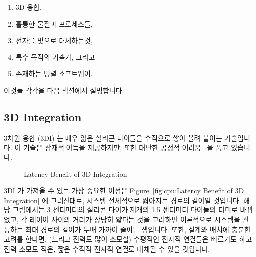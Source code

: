 \begin{enumerate}
\item	3D 융합,
\item	훌륭한 물질과 프로세스들,
\item	전자를 빛으로 대체하는것,
\item	특수 목적의 가속기, 그리고
\item	존재하는 병렬 소프트웨어.
\end{enumerate}

이것들 각각을 다음 섹션에서 설명합니다.

\iffalse
There are nevertheless some technologies (both hardware and software)
that might help improve matters:

\begin{enumerate}
\item	3D integration,
\item	Novel materials and processes,
\item	Substituting light for electricity,
\item	Special-purpose accelerators, and
\item	Existing parallel software.
\end{enumerate}

Each of these is described in one of the following sections.
\fi

\subsection{3D Integration}
\label{sec:cpu:3D Integration}

3차원 융합 (3DI) 는 매우 얇은 실리콘 다이들을 수직으로 쌓아 올려 붙이는
기술입니다.
이 기술은 잠재적 이득을 제공하지만, 또한 대단한 공정적
어려움~\cite{JohnKnickerbocker2008:3DI} 을 품고 있습니다.

\iffalse
3-dimensional integration (3DI) is the practice of bonding
very thin silicon dies to each other in a vertical stack.
This practice provides potential benefits, but also poses
significant fabrication challenges~\cite{JohnKnickerbocker2008:3DI}.
\fi

\begin{figure}[tb]
\begin{center}
\end{center}
\caption{Latency Benefit of 3D Integration}
\label{fig:cpu:Latency Benefit of 3D Integration}
\end{figure}

3DI 가 가져올 수 있는 가장 중요한 이점은 Figure~\ref{fig:cpu:Latency Benefit of
3D Integration} 에 그려진대로, 시스템 전체적으로 짧아지는 경로의 길이일
것입니다.
해당 그림에서는 3 센티미터의 실리콘 다이가 제개의 1.5 센티미터 다이들의 더미로
바뀌었고, 각 레이어 사이의 거리가 상당히 얇다는 것을 고려하면 이론적으로
시스템을 관통하는 최대 경로의 길이가 두배 가까이 줄어든 셈입니다.
또한, 설계와 배치에 충분한 고려를 한다면, (느리고 전력도 많이 소모할) 수평적인
전자적 연결들은 빠르기도 하고 전력 소모도 적은, 짧은 수직적 전자적 연결로
대체될 수 있을 것입니다.

